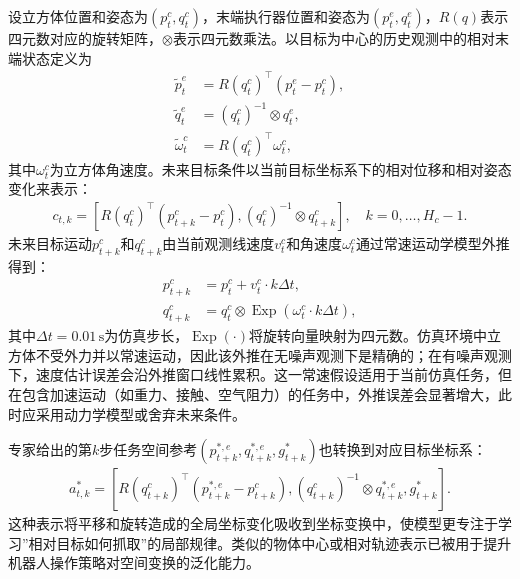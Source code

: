 设立方体位置和姿态为$(p^c_t,q^c_t)$，末端执行器位置和姿态为$(p^e_t,q^e_t)$，$R(q)$表示四元数对应的旋转矩阵，$\otimes$表示四元数乘法。以目标为中心的历史观测中的相对末端状态定义为
\begin{align}
    \tilde{p}^e_t &= R(q^c_t)^\top\left(p^e_t-p^c_t\right), \\
    \tilde{q}^e_t &= \left(q^c_t\right)^{-1}\otimes q^e_t, \\
    \tilde{\omega}^c_t &= R(q^c_t)^\top \omega^c_t,
    \label{eq:target-centric-observation}
\end{align}
其中$\omega^c_t$为立方体角速度。未来目标条件以当前目标坐标系下的相对位移和相对姿态变化来表示：
\begin{align}
    c_{t,k}=\left[
        R(q^c_t)^\top\left(p^c_{t+k}-p^c_t\right),
        \left(q^c_t\right)^{-1}\otimes q^c_{t+k}
    \right],\quad k=0,\ldots,H_c-1.
    \label{eq:future-condition}
\end{align}
未来目标运动$p^c_{t+k}$和$q^c_{t+k}$由当前观测线速度$v^c_t$和角速度$\omega^c_t$通过常速运动学模型外推得到：
\begin{align}
    p^c_{t+k} &= p^c_t + v^c_t\cdot k\Delta t, \\
    q^c_{t+k} &= q^c_t \otimes \operatorname{Exp}\left(\omega^c_t\cdot k\Delta t\right),
    \label{eq:constant-velocity-extrapolation}
\end{align}
其中$\Delta t=0.01\,\mathrm{s}$为仿真步长，$\operatorname{Exp}(\cdot)$将旋转向量映射为四元数。仿真环境中立方体不受外力并以常速运动，因此该外推在无噪声观测下是精确的；在有噪声观测下，速度估计误差会沿外推窗口线性累积。这一常速假设适用于当前仿真任务，但在包含加速运动（如重力、接触、空气阻力）的任务中，外推误差会显著增大，此时应采用动力学模型或舍弃未来条件。

专家给出的第$k$步任务空间参考$(p^{*,e}_{t+k},q^{*,e}_{t+k},g^*_{t+k})$也转换到对应目标坐标系：
\begin{align}
    a^*_{t,k}=\left[
        R(q^c_{t+k})^\top\left(p^{*,e}_{t+k}-p^c_{t+k}\right),
        \left(q^c_{t+k}\right)^{-1}\otimes q^{*,e}_{t+k},
        g^*_{t+k}
    \right].
    \label{eq:target-centric-action}
\end{align}
这种表示将平移和旋转造成的全局坐标变化吸收到坐标变换中，使模型更专注于学习”相对目标如何抓取”的局部规律。类似的物体中心或相对轨迹表示已被用于提升机器人操作策略对空间变换的泛化能力\citep{zeng2021transporter,chi2024universal}。

